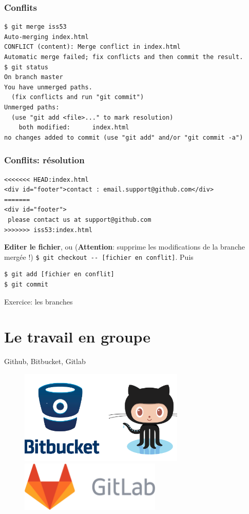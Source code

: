 \documentclass{beamer}
\begin{document}
\begin{frame}[fragile]
    \frametitle{Conflits}
\begin{lstlisting}
$ git merge iss53
Auto-merging index.html
CONFLICT (content): Merge conflict in index.html
Automatic merge failed; fix conflicts and then commit the result.
$ git status
On branch master
You have unmerged paths.
  (fix conflicts and run "git commit")
Unmerged paths:
  (use "git add <file>..." to mark resolution)
    both modified:      index.html
no changes added to commit (use "git add" and/or "git commit -a")
\end{lstlisting}
\end{frame}

\begin{frame}[fragile]
    \frametitle{Conflits: résolution}
\begin{lstlisting}
<<<<<<< HEAD:index.html
<div id="footer">contact : email.support@github.com</div>
=======
<div id="footer">
 please contact us at support@github.com
>>>>>>> iss53:index.html
\end{lstlisting}
\textbf{Editer le fichier}, ou
(\textbf{Attention}: supprime les modifications de la branche mergée !)
\lstinline{$ git checkout -- [fichier en conflit]}.
Puis
\begin{lstlisting}
$ git add [fichier en conflit]
$ git commit
\end{lstlisting}
\end{frame}

\begin{frame}{Exercice: les branches}

\end{frame}

\section{Le travail en groupe}

\begin{frame}{Github, Bitbucket, Gitlab}
\begin{figure}
    \centering
    \includegraphics[width=0.7\textwidth]{img/github-bitbucket.png} \\
    \includegraphics[width=0.6\textwidth]{img/gitlab.png}
\end{figure}
\end{frame}
\end{document}
